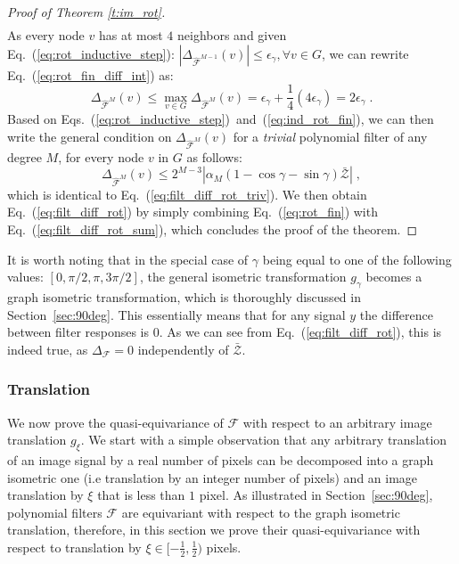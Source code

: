 \documentclass[10pt,journal,compsoc]{IEEEtran}
\newcommand{\hmF}{\hat{\mathcal{F}}}
\newcommand{\norm}[1]{\left|#1\right|}
\begin{document}
\begin{proof}[Proof of Theorem \ref{t:im_rot}]
\begin{equation}
\begin{aligned}
		\end{aligned}
		\label{eq:rot_fin_diff_int}
		\end{equation}
		\noindent
		As every node $v$ has at most $4$ neighbors and given Eq.~({\ref{eq:rot_inductive_step}): $| \Delta_{\hmF^{M-1}} (v) | \leq \epsilon_\gamma, \forall v \in G$, we can rewrite Eq.~(\ref{eq:rot_fin_diff_int}) as}:
		\begin{equation}
		\Delta_{\hmF^{M}}(v) \leq \max_{v \in G} \Delta_{\hmF^{M}} (v) = \epsilon_\gamma + \frac{1}{4}(4 \epsilon_\gamma) = 2\epsilon_\gamma \;.
		\label{eq:ind_rot_fin}
		\end{equation}
		\noindent
		Based on Eqs.~(\ref{eq:rot_inductive_step})~and~(\ref{eq:ind_rot_fin}), we can then write the general condition on $\Delta_{\hmF^{M}}(v)$ for a \emph{trivial} polynomial filter of any degree $M$, for every node $v$ in $G$ as follows:
		\begin{equation}
		\Delta_{\hmF^{M}} (v) \leq 2^{M-3} \norm{\alpha_{M} (1 - \cos \gamma - \sin \gamma) \bar{\mathcal{Z}}} \;,
		\label{eq:rot_fin}
		\end{equation}
		\noindent
		which is identical to Eq.~(\ref{eq:filt_diff_rot_triv}). We then obtain Eq.~(\ref{eq:filt_diff_rot}) by simply combining Eq.~(\ref{eq:rot_fin}) with Eq.~(\ref{eq:filt_diff_rot_sum}), which concludes the proof of the theorem.
	\end{proof}

	It is worth noting that in the special case of $\gamma$ being equal to one of the following values: $[0, \pi/2, \pi, 3\pi/2]$, the general isometric transformation $g_\gamma$ becomes a graph isometric transformation, which is thoroughly discussed in Section~\ref{sec:90deg}. This essentially means that for any signal $y$ the difference between filter responses is $0$. As we can see from Eq.~(\ref{eq:filt_diff_rot}), this is indeed true, as $\Delta_\mathcal{F} = 0$ independently of $\bar{\mathcal{Z}}$.

	\subsubsection{Translation}
	\label{sec:trans}

	We now prove the quasi-equivariance of $\mathcal{F}$ with respect to an arbitrary image translation $g_\xi$. We start with a simple observation that any arbitrary translation of an image signal by a real number of pixels can be decomposed into a graph isometric one (i.e translation by an integer number of pixels) and an image translation by $\xi$ that is less than $1$ pixel. As illustrated in Section~\ref{sec:90deg}, polynomial filters $\mathcal{F}$ are equivariant with respect to the graph isometric translation, therefore, in this section we prove their quasi-equivariance with respect to translation by $\xi \in [-\frac{1}{2},\frac{1}{2})$ pixels.
\end{document}
